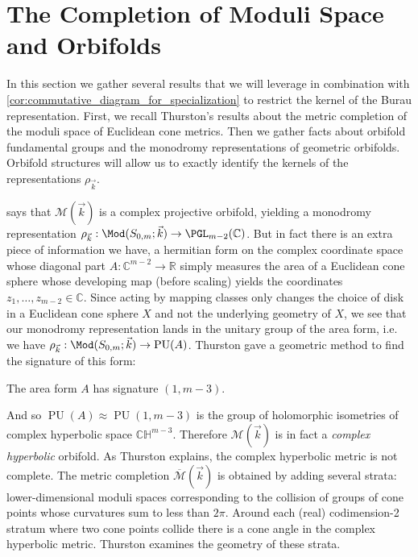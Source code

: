 \documentclass{amsart}
\begin{document}
\section{The Completion of Moduli Space and Orbifolds}\label{sec:Completion of M}
    In this section we gather several results that we will leverage in combination with \cref{cor:commutative_diagram_for_specialization} to restrict the kernel of the Burau representation. First, we recall Thurston's results about the metric completion of the moduli space of Euclidean cone metrics. Then we gather facts about orbifold fundamental groups and the monodromy representations of geometric orbifolds. Orbifold structures will allow us to exactly identify the kernels of the representations $\rho_{\vec k}$.

     says that $\mathcal{M}(\vec k)$ is a complex projective orbifold, yielding a monodromy representation $\rho_{\vec k}:\Mod(S_{0,m};\vec k) \to \PGL_{m-2}(\mathbb C)$. But in fact there is an extra piece of information we have, a hermitian form on the complex coordinate space whose diagonal part $A:\mathbb{C}^{m-2} \to \mathbb R$ simply measures the area of a Euclidean cone sphere whose developing map (before scaling) yields the coordinates $z_1,\dotsc,z_{m-2} \in \mathbb C$. Since acting by mapping classes only changes the choice of disk in a Euclidean cone sphere $X$ and not the underlying geometry of $X$, we see that our monodromy representation lands in the unitary group of the area form, i.e. we have $\rho_{\vec k}:\Mod(S_{0,m}; 
    \vec k) \to \operatorname{PU}(A)$. Thurston gave a geometric method to find the signature of this form:
    
    \begin{lemma} \label{lemma:hyperbolic_signature}
        The area form $A$ has signature $(1,m-3)$.
    \end{lemma}
    
    And so $\operatorname{PU}(A) \approx \operatorname{PU}(1,m-3)$ is the group of holomorphic isometries of complex hyperbolic space $\mathbb{CH}^{m-3}$. Therefore $\mathcal{M}(\vec k)$ is in fact a \emph{complex hyperbolic} orbifold. As Thurston explains, the complex hyperbolic metric is not complete. The metric completion $\overline{\mathcal M}(\vec k)$ is obtained by adding several strata: lower-dimensional moduli spaces corresponding to the collision of groups of cone points whose curvatures sum to less than $2\pi$. Around each (real) codimension-2 stratum where two cone points collide there is a cone angle in the complex hyperbolic metric. Thurston examines the geometry of these strata.
    
\end{document}
